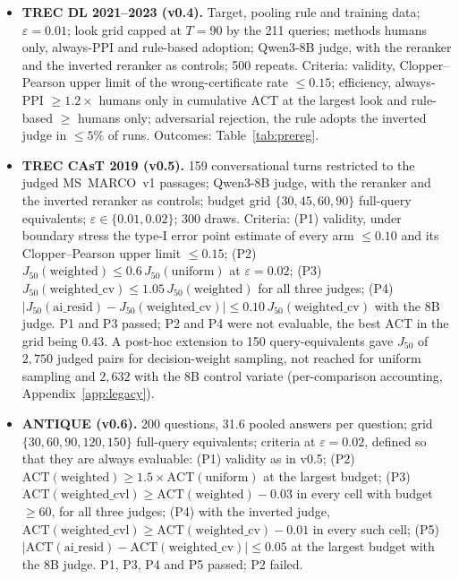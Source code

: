 \documentclass{article}
\newcommand{\eps}{\varepsilon}
\newcommand{\ACT}{\mathrm{ACT}}
\newcommand{\Jfifty}{J_{50}}
\begin{document}
\begin{itemize}
\item \textbf{TREC DL 2021--2023 (v0.4).} Target, pooling rule and training data; $\eps=0.01$; look grid capped at $T=90$ by the 211 queries; methods humans only, always-PPI and rule-based adoption; Qwen3-8B judge, with the reranker and the inverted reranker as controls; 500 repeats. Criteria: validity, Clopper--Pearson upper limit of the wrong-certificate rate $\le0.15$; efficiency, always-PPI $\ge1.2\times$ humans only in cumulative $\ACT$ at the largest look and rule-based $\ge$ humans only; adversarial rejection, the rule adopts the inverted judge in $\le5\%$ of runs. Outcomes: Table~\ref{tab:prereg}.
\item \textbf{TREC CAsT 2019 (v0.5).} 159 conversational turns restricted to the judged MS~MARCO~v1 passages; Qwen3-8B judge, with the reranker and the inverted reranker as controls; budget grid $\{30,45,60,90\}$ full-query equivalents; $\eps\in\{0.01,0.02\}$; 300 draws. Criteria: (P1) validity, under boundary stress the type-I error point estimate of every arm $\le0.10$ and its Clopper--Pearson upper limit $\le0.15$; (P2) $\Jfifty(\text{weighted})\le0.6\,\Jfifty(\text{uniform})$ at $\eps=0.02$; (P3) $\Jfifty(\text{weighted\_cv})\le1.05\,\Jfifty(\text{weighted})$ for all three judges; (P4) $|\Jfifty(\text{ai\_resid})-\Jfifty(\text{weighted\_cv})|\le0.10\,\Jfifty(\text{weighted\_cv})$ with the 8B judge. P1 and P3 passed; P2 and P4 were not evaluable, the best $\ACT$ in the grid being $0.43$. A post-hoc extension to 150 query-equivalents gave $\Jfifty$ of $2{,}750$ judged pairs for decision-weight sampling, not reached for uniform sampling and $2{,}632$ with the 8B control variate (per-comparison accounting, Appendix~\ref{app:legacy}).
\item \textbf{ANTIQUE (v0.6).} 200 questions, 31.6 pooled answers per question; grid $\{30,60,90,120,150\}$ full-query equivalents; criteria at $\eps=0.02$, defined so that they are always evaluable: (P1) validity as in v0.5; (P2) $\ACT(\text{weighted})\ge1.5\times\ACT(\text{uniform})$ at the largest budget; (P3) $\ACT(\text{weighted\_cvl})\ge\ACT(\text{weighted})-0.03$ in every cell with budget $\ge60$, for all three judges; (P4) with the inverted judge, $\ACT(\text{weighted\_cvl})\ge\ACT(\text{weighted\_cv})-0.01$ in every such cell; (P5) $|\ACT(\text{ai\_resid})-\ACT(\text{weighted\_cv})|\le0.05$ at the largest budget with the 8B judge. P1, P3, P4 and P5 passed; P2 failed.
\end{itemize}
\end{document}
